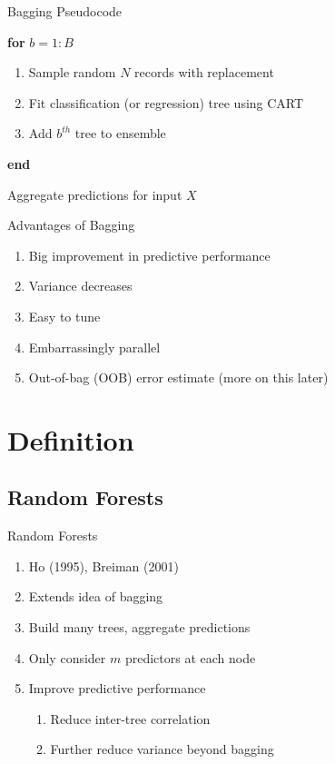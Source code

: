 \documentclass[pdf]{beamer}
\begin{document}
		
		\begin{frame}{Bagging Pseudocode}
			\begin{enumerate}[]
				{\selectfont
				\item{\textbf{for} $b = 1:B$}
					\begin{enumerate}[]
						\item{\hspace{3 mm} Sample random $N$ records with replacement}
						\item{\hspace{3 mm} Fit classification (or regression) tree using CART}
						\item{\hspace{3 mm} Add $b^{th}$ tree to ensemble}
					\end{enumerate}
				\item{\textbf{end}}
				\item Aggregate predictions for input $X$
				}
			\end{enumerate}
		\end{frame}
	
		
		\begin{frame}{Advantages of Bagging}
			\begin{enumerate}
				\item Big improvement in predictive performance
				\item Variance decreases
				\item Easy to tune
				\item Embarrassingly parallel
				\item Out-of-bag (OOB) error estimate (more on this later)
					
			\end{enumerate}
		\end{frame}

		
	
\section{Definition}
	\subsection{Random Forests}
		\begin{frame}{Random Forests}
    			\begin{enumerate}
				\item{Ho (1995), Breiman (2001)}
				\item{Extends idea of bagging}
				\item{Build many trees, aggregate predictions}
				\item{Only consider $m$ predictors at each node}
				\item{Improve predictive performance}
					\begin{enumerate}[1]
						\item Reduce inter-tree correlation
						\item Further reduce variance beyond bagging
					\end{enumerate}
			\end{enumerate}
    		\end{frame}
\end{document}
